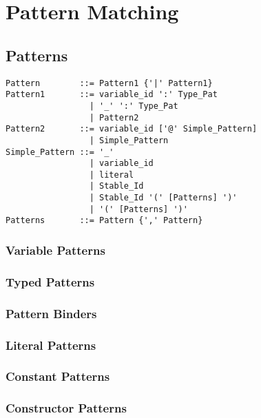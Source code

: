
\chapter{Pattern Matching}
\label{sec:pattern-matching}

\section{Patterns}
\label{sec:patterns}

\syntax\begin{lstlisting}
Pattern        ::= Pattern1 {'|' Pattern1}
Pattern1       ::= variable_id ':' Type_Pat
                 | '_' ':' Type_Pat
                 | Pattern2
Pattern2       ::= variable_id ['@' Simple_Pattern]
                 | Simple_Pattern
Simple_Pattern ::= '_'
                 | variable_id
                 | literal
                 | Stable_Id
                 | Stable_Id '(' [Patterns] ')' 
                 | '(' [Patterns] ')'
Patterns       ::= Pattern {',' Pattern}
\end{lstlisting}

\subsection{Variable Patterns}

\subsection{Typed Patterns}

\subsection{Pattern Binders}

\subsection{Literal Patterns}

\subsection{Constant Patterns}
\label{sec:constant-patterns}

\subsection{Constructor Patterns}
\label{sec:constructor-patterns}

